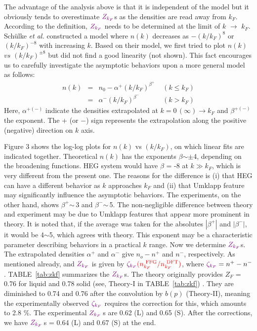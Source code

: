 \documentclass[twocolumn,showpacs,showkeys,fleqn,prl,superscriptaddress]{revtex4}%
\newcommand{\nn}[1]{\textnormal{ #1}}
\newcommand{\ii}[1]{\textit{#1}}
\begin{document}
The advantage of the analysis above is {\color{violet}that it is} independent of the model but it obviously tends to overestimate ${\color{violet}Z_{k_F}}$s as the densities are read away from $k_F$.
According to the definition, ${\color{violet}Z_{k_F}}$ needs to be determined at the limit of $k$ $\to$ $k_F$. 
Sch{\"u}lke \ii{et al.}\,\,constructed a model where $n(k)$ decreases as $-(k/k_F)^{8}$ or $(k/k_F)^{-8}$ with increasing $k$\cite{schulke96}.
Based on their model, we first tried to plot $n(k)$ $vs$ $(k/k_F)^{\pm 8}$ but did not find a good linearity (not shown).
This fact encourages us to carefully investigate the asymptotic behaviors upon a more general model as follows: 
\begin{eqnarray}
n(k) &=& n_0 - \alpha^{+}  (k/k_F)^{\beta^+}  \;\;\;\; (k \leq k_F)  \nonumber \\
&=&  \alpha^{-}  (k/k_F)^{\beta^-}  \;\;\;\;\;\;\;\;\;\;\;\; (k>k_F)
\end{eqnarray}
Here, $\alpha^{+(-)}$ indicate the densities extrapolated at ${k=0\,(\infty) \to k_F}$ and $\beta^{+(-)}$ the exponent.
The $+$ (or $-$) sign represents the extrapolation along the positive (negative) direction on $k$ axis.

Figure 3 shows the log-log plots for $n(k)$ vs $(k/k_F)$, on which linear fits are indicated together. 
Theoretical $n(k)$ has the exponents $\beta$$\sim\pm$4, depending on the broadening functions.
HEG system would have $\beta$ = -8 at $k \gg k_F$, which is very different from the present one.
The reasons for the difference is (i) that HEG can have a different behavior as $k$ approaches $k_F$ and (ii) that Umklapp feature may significantly influence the asymptotic behaviors.
The experiments, on the other hand, shows $\beta^+$$\sim\,$3 and $\beta^-$$\sim\,$5. 
The non-negligible difference between theory and experiment may be due to Umklapp features that appear more prominent in theory.
It is noted that, if the average was taken for the absolutes $| \beta^+ |$ and $| \beta^- |$, it would be 4$\sim$5, which agrees with theory.
This exponent may be a characteristic parameter describing behaviors in a practical $k$ range.
Now we determine ${\color{violet}Z_{k_F}}$s. 
The extrapolated densities $\alpha^+$ and $\alpha^-$ give $n_o - n^+$ and $n^-$, respectively.
As mentioned already,  and ${\color{violet}Z_{k_F}}$ is given by ${\color{violet}\zeta_{k_F}}{\color{red}(n_{k_F}^{\nn{FFG}}/n_{k_F}^{\nn{DFT}})}$, where ${\color{violet}\zeta_{k_F}}= n^+ - n^-$.   
TABLE~\ref{tab:zkf} summarizes the ${\color{violet}Z_{k_F}}$s. 
The theory originally provides $Z_F$ = 0.76 for liquid and 0.78 solid  (see, Theory-I in TABLE~\ref{tab:zkf}) .
They are diminished to 0.74 and 0.76 after the convolution by $b(p)$ (Theory-II), meaning the experimentally observed ${\color{violet}\zeta_{k_F}}$ requires the correction for this, which amounts to 2.8 \%.
The experimental ${\color{violet}Z_{k_F}}\,$s are 0.62 (L) and 0.65 (S). After the corrections, we have ${\color{violet}Z_{k_F}}\,$s = 0.64 (L) and 0.67 (S) at the end.    
\end{document}
